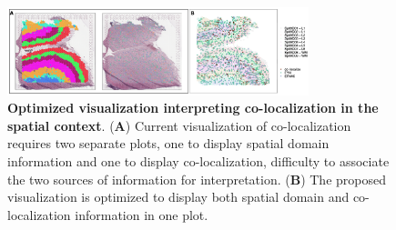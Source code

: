 \documentclass[11pt]{article}
\begin{document}
\clearpage
\begin{figure}
\vspace{-0.3in}
\begin{center}
\includegraphics[width=0.78\textwidth]{figure/new_visiual.png}
\end{center}
\vspace{-0.35in}
\caption{\footnotesize \textbf{Optimized visualization interpreting co-localization in the spatial context}. (\textbf{A}) Current visualization of co-localization requires two separate plots, one to display spatial domain information and one to display co-localization, difficulty to associate the two sources of information for interpretation. (\textbf{B}) The proposed visualization is optimized to display both spatial domain and co-localization information in one plot.}
\label{fig:visual} 
\end{figure}


\clearpage 

\end{document}
